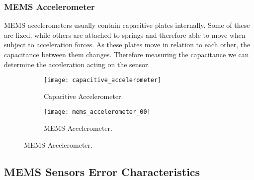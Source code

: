 \subsubsection{MEMS Accelerometer}

MEMS accelerometers usually contain capacitive plates internally. Some of these are fixed, while others are attached to springs and therefore able to move when subject to acceleration forces. As these plates move in relation to each other, the capacitance between them changes. Therefore measuring the capacitance we can determine the acceleration acting on the sensor.



\begin{figure}[htb]
 \centering
	\begin{subfigure}{0.48\textwidth}
		\texttt{[image: capacitive\_accelerometer]}
		\caption{Capacitive Accelerometer.}
	\end{subfigure}\hfil
	\begin{subfigure}{0.48\textwidth}
		\texttt{[image: mems\_accelerometer\_00]}
		\caption{MEMS Accelerometer.}
	\end{subfigure}
\end{figure}


\subsection{MEMS Sensors Error Characteristics}\label{mems_errors}

